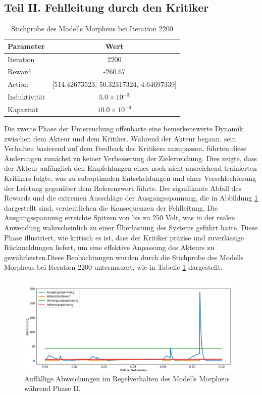 \subsection{Teil II. Fehlleitung durch den Kritiker}
\label{subsec:Phase2_Misguidance_by_Critic}


\begin{table}[htbp]
\centering
\caption{Stichprobe des Modells Morpheus bei Iteration 2200}
\label{tab:sample_morpheus_2200}
\begin{tabular}{l c}
\hline
\textbf{Parameter} & \textbf{Wert} \\
\hline
Iteration & 2200 \\
Reward & -260.67 \\
Action & [514.42673523, 50.32317324, 4.64697339] \\
Induktivität & \( 5.0 \times 10^{-3} \) \\
Kapazität & \( 10.0 \times 10^{-6} \) \\
\hline
\end{tabular}
\end{table}


Die zweite Phase der Untersuchung offenbarte eine bemerkenswerte Dynamik zwischen dem Akteur und dem Kritiker. Während der Akteur begann, sein Verhalten basierend auf dem Feedback des Kritikers anzupassen, führten diese Änderungen zunächst zu keiner Verbesserung der Zielerreichung. Dies zeigte, dass der Akteur anfänglich den Empfehlungen eines noch nicht ausreichend trainierten Kritikers folgte, was zu suboptimalen Entscheidungen und einer Verschlechterung der Leistung gegenüber dem Referenzwert führte. Der signifikante Abfall des Rewards und die extremen Ausschläge der Ausgangsspannung, die in Abbildung \ref{fig:phase_ii_morpheus} dargestellt sind, verdeutlichen die Konsequenzen der Fehlleitung. Die Ausgangsspannung erreichte Spitzen von bis zu 250 Volt, was in der realen Anwendung wahrscheinlich zu einer Überlastung des Systems geführt hätte. Diese Phase illustriert, wie kritisch es ist, dass der Kritiker präzise und zuverlässige Rückmeldungen liefert, um eine effektive Anpassung des Akteurs zu gewährleisten.Diese Beobachtungen wurden durch die Stichprobe des Modells Morpheus bei Iteration 2200 untermauert, wie in Tabelle \ref{tab:sample_morpheus_2200} dargestellt.


\begin{figure}[htbp]
\centering
\includegraphics[width=\textwidth]{4Ergebnisse/Phasen/2Phase/TEilII_2.png}
\caption{Auffällige Abweichungen im Regelverhalten des Modells Morpheus während Phase II.}
\label{fig:phase_ii_morpheus}
\end{figure}
